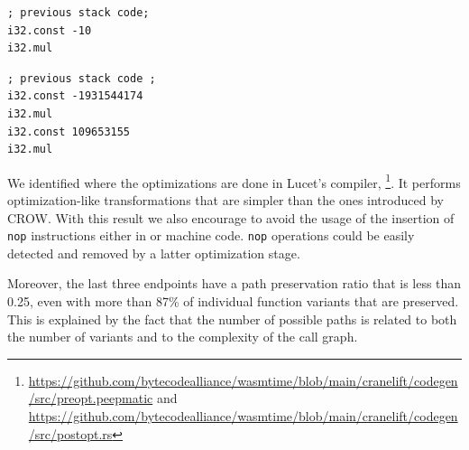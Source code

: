 \lstset{
    language=WAT,
    style=WATStyle,
    stepnumber=0,
    label=EQExample}
\begin{code}
\noindent\begin{minipage}[b]{0.9\linewidth}
    
    \begin{minipage}[t]{0.45\linewidth}
        \begin{lstlisting}
; previous stack code;
i32.const -10
i32.mul
        \end{lstlisting}
    \end{minipage}%
    \hfill\noindent\begin{minipage}[t]{0.45\linewidth}
       
        \begin{lstlisting}
; previous stack code ;
i32.const -1931544174
i32.mul
i32.const 109653155
i32.mul
        \end{lstlisting}
    \end{minipage}
    
    \label{mul:prevalence_example}
\end{minipage}
\end{code}





We identified where the optimizations are done in Lucet's compiler, \footnote{\url{https://github.com/bytecodealliance/wasmtime/blob/main/cranelift/codegen/src/preopt.peepmatic} and \url{https://github.com/bytecodealliance/wasmtime/blob/main/cranelift/codegen/src/postopt.rs}}. It performs optimization-like transformations that are simpler than the ones introduced by CROW. 
With this result we also encourage to avoid the usage of the insertion of \texttt{nop} instructions either in or machine code. \texttt{nop} operations could be easily detected and removed by a latter optimization stage.



Moreover, the last three endpoints have a path preservation ratio that is less than 0.25, even with more than 87\%  of individual function  variants that are preserved. This is explained by the fact that the number of possible paths is related to both the number of variants and to the complexity of the call graph.


